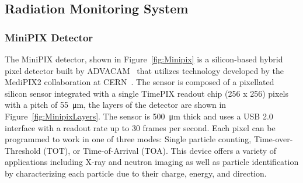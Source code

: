 \subsection{Radiation Monitoring System}
\label{sec:RadiationDesign}

\subsubsection{MiniPIX Detector}
The MiniPIX detector, shown in Figure~\ref{fig:Minipix} is a silicon-based hybrid pixel detector built by ADVACAM~\cite{advacam} that utilizes technology developed by the MediPIX2 collaboration at CERN~\cite{medipix}. The sensor is composed of a pixellated silicon sensor integrated with a single TimePIX readout chip (256 x 256) pixels with a pitch of \SI{55}{\micro\meter}, the layers of the detector are shown in Figure~\ref{fig:MinipixLayers}. The sensor is \SI{500}{\micro\meter} thick and uses a USB 2.0 interface with a readout rate up to 30 frames per second. Each pixel can be programmed to work in one of three modes: Single particle counting, Time-over-Threshold (TOT), or Time-of-Arrival (TOA). This device offers a variety of applications including X-ray and neutron imaging as well as particle identification by characterizing each particle due to their charge, energy, and direction.

